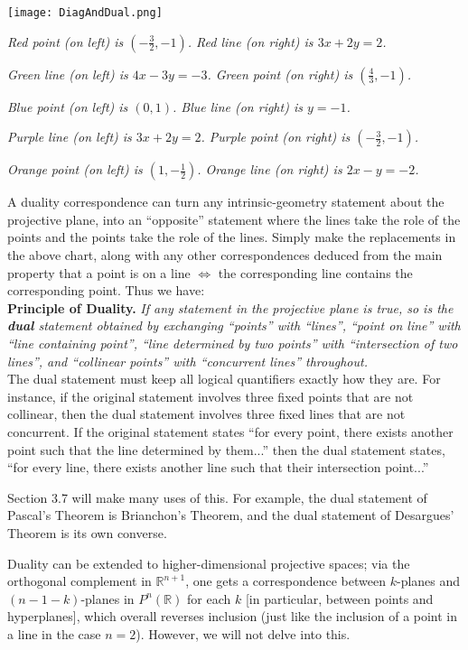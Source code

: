 \documentclass[leqno]{book}
\begin{document}
\begin{center}
\texttt{[image: DiagAndDual.png]}

\emph{Red point (on left) is $(-\frac 32,-1)$.  Red line (on right) is $3x+2y=2$.}

\emph{Green line (on left) is $4x-3y=-3$.  Green point (on right) is $(\frac 43,-1)$.}

\emph{Blue point (on left) is $(0,1)$.  Blue line (on right) is $y=-1$.}

\emph{Purple line (on left) is $3x+2y=2$.  Purple point (on right) is $(-\frac 32,-1)$.}

\emph{Orange point (on left) is $(1,-\frac 12)$.  Orange line (on right) is $2x-y=-2$.}
\end{center}

A duality correspondence can turn any intrinsic-geometry statement about the projective plane, into an ``opposite'' statement where the lines take the role of the points and the points take the role of the lines.  Simply make the replacements in the above chart, along with any other correspondences deduced from the main property that a point is on a line $\iff$ the corresponding line contains the corresponding point.  Thus we have:\\

\noindent\textbf{Principle of Duality.} \emph{If any statement in the projective plane is true, so is the \textbf{dual} statement obtained by exchanging ``points'' with ``lines'', ``point on line'' with ``line containing point'', ``line determined by two points'' with ``intersection of two lines'', and ``collinear points'' with ``concurrent lines'' throughout.}\\

\noindent The dual statement must keep all logical quantifiers exactly how they are.  For instance, if the original statement involves three fixed points that are not collinear, then the dual statement involves three fixed lines that are not concurrent.  If the original statement states ``for every point, there exists another point such that the line determined by them...'' then the dual statement states, ``for every line, there exists another line such that their intersection point...''

Section 3.7 will make many uses of this.  For example, the dual statement of Pascal's Theorem is Brianchon's Theorem, and the dual statement of Desargues' Theorem is its own converse.

Duality can be extended to higher-dimensional projective spaces; via the orthogonal complement in $\mathbb R^{n+1}$, one gets a correspondence between $k$-planes and $(n-1-k)$-planes in $P^n(\mathbb R)$ for each $k$ [in particular, between points and hyperplanes], which overall reverses inclusion (just like the inclusion of a point in a line in the case $n=2$).  However, we will not delve into this.\\
\end{document}
